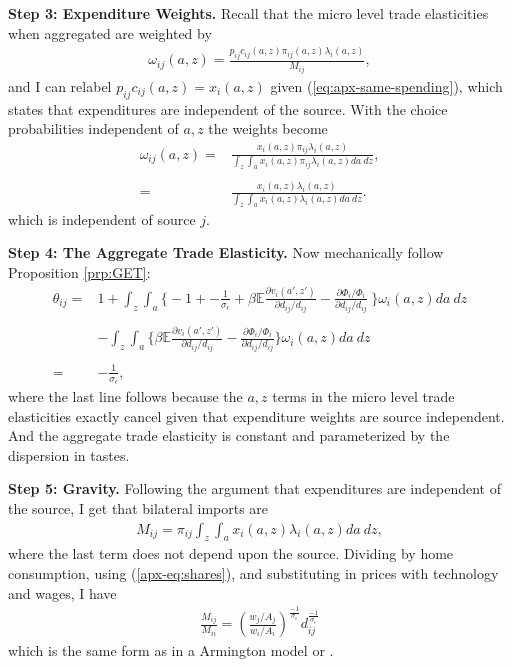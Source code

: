 \documentclass[12pt,pdftex]{article}
\begin{document}
\begin{onehalfspacing}
\textbf{Step 3: Expenditure Weights.} Recall that the micro level trade elasticities when aggregated are weighted by
\begin{align}
\omega_{ij}(a,z) = \frac{p_{ij}c_{ij}(a,z)\pi_{ij}(a,z) \lambda_{i}(a,z)}{M_{ij}},
\end{align}
and I can relabel $p_{ij}c_{ij}(a,z) = x_{i}(a,z)$ given (\ref{eq:apx-same-spending}), which states that expenditures are independent of the source. With the choice probabilities independent of $a,z$ the weights become
\begin{align}
\omega_{ij}(a,z) =& \frac{x_{i}(a,z)\pi_{ij} \lambda_{i}(a,z)}{\int_{z}\int_{a}x_{i}(a,z)\pi_{ij} \lambda_{i}(a,z)da \ dz}, \\
\nonumber \\
=& \frac{x_{i}(a,z) \lambda_{i}(a,z)}{\int_{z}\int_{a} x_{i}(a,z) \lambda_{i}(a,z)da \ dz}.
\end{align}
which is independent of source $j$.

\textbf{Step 4: The Aggregate Trade Elasticity.} Now mechanically follow Proposition \ref{prp:GET}:
\begin{align}
\nonumber
\theta_{ij} =& 1 + \int_{z}\int_{a} \bigg \{ -1 +  -\frac{1}{\sigma_{\epsilon}} + \beta \mathbb{E} \frac{\partial v_{i}(a',z')}{\partial d_{ij}/d_{ij}} -  \frac{\partial \Phi_{i} / \Phi_{i}}{\partial d_{ij}/d_{ij}} \  \bigg \}\omega_{i}(a,z)da \ dz \\
\nonumber \\
& - \int_{z}\int_{a} \bigg \{   \beta \mathbb{E} \frac{\partial v_{i}(a',z')}{\partial d_{ij}/d_{ij}} -  \frac{\partial \Phi_{i} / \Phi_{i}}{\partial d_{ij}/d_{ij}}  \bigg \}\omega_{i}(a,z)da \ dz \\
\nonumber \\
= & -\frac{1}{\sigma_{\epsilon}}, \nonumber
\end{align}
where the last line follows because the $a,z$ terms in the micro level trade elasticities exactly cancel given that expenditure weights are source independent. And the aggregate trade elasticity is constant and parameterized by the dispersion in tastes.

\textbf{Step 5: Gravity.} Following the argument that expenditures are independent of the source, I get that bilateral imports are
\begin{align}
M_{ij} = \pi_{ij} \int_{z}\int_{a} x_{i}(a,z) \lambda_{i}(a,z)da \ dz,
\end{align}
where the last term does not depend upon the source. Dividing by home consumption, using (\ref{apx-eq:shares}), and substituting in prices with technology and wages, I have
\begin{align}
\frac{M_{ij}}{M_{ii}} = \left( \frac{  w_{j} / A_{j} }{  w_{i} / A_{i} } \right)^{\frac{-1}{\sigma_{\epsilon}}} d_{ij}^{\frac{-1}{\sigma_{\epsilon}}}
\end{align}
which is the same form as in a Armington model or \citet{eaton2002technology}.


\end{onehalfspacing}
\end{document}
